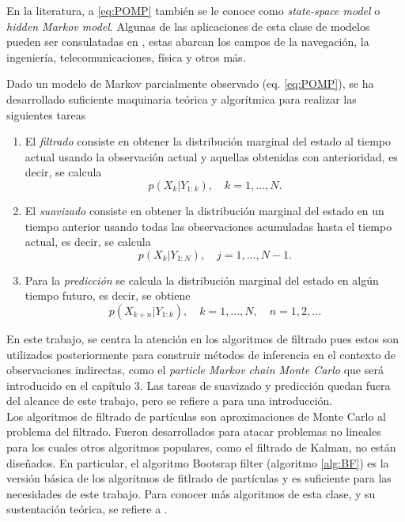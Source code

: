En la literatura, a \ref{eq:POMP} también se le conoce como \textit{state-space model} 
o \textit{hidden Markov model}. Algunas de las aplicaciones de esta clase de modelos 
pueden ser consulatadas en \cite{sarkkaBayesianFilteringSmoothing2023}, estas 
abarcan los campos de la navegación, la ingeniería, telecomunicaciones, física y 
otros más.

Dado un modelo de Markov parcialmente observado (eq. \ref{eq:POMP}), se ha desarrollado
suficiente maquinaria teórica y algorítmica para realizar las siguientes tareas 
\begin{enumerate}
    \item El \textit{filtrado} consiste en obtener la distribución marginal del 
    estado al tiempo actual usando la observación actual y aquellas 
    obtenidas con anterioridad, es decir, se calcula 
    $$p(X_k|Y_{1:k}),\quad k = 1,...,N.$$
    \item El \textit{suavizado} consiste en obtener la distribución marginal 
    del estado en un tiempo anterior usando todas las observaciones acumuladas hasta 
    el tiempo actual, es decir, se calcula 
    $$p(X_k|Y_{1:N}),\quad j = 1,...,N-1.$$
    \item Para la \textit{predicción} se calcula la distribución marginal del estado 
    en algún tiempo futuro, es decir, se obtiene 
    $$p(X_{k+n}|Y_{1:k}),\quad k = 1,...,N,\quad n=1,2,...$$
\end{enumerate}

En este trabajo, se centra la atención en los algoritmos de filtrado 
pues estos son utilizados posteriormente para construir métodos de inferencia 
en el contexto de observaciones indirectas, 
como el \textit{particle Markov chain Monte Carlo} que será introducido 
en el capítulo 3. Las tareas de suavizado y predicción quedan fuera del 
alcance de este trabajo, pero se refiere a \cite{sarkkaBayesianFilteringSmoothing2023}
para una introducción.\\

Los algoritmos de filtrado de partículas son aproximaciones de Monte Carlo al problema 
del filtrado. Fueron desarrollados para atacar problemas no lineales para los cuales 
otros algoritmos populares, como el filtrado de Kalman, no están diseñados. En particular, 
el algoritmo Bootsrap filter (algoritmo \ref{alg:BF}) es la versión básica de los algoritmos 
de fitlrado de partículas y es suficiente para las necesidades de este trabajo. 
Para conocer más algoritmos de esta clase, y su sustentación teórica, se refiere a 
\cite{sarkkaBayesianFilteringSmoothing2023}.

